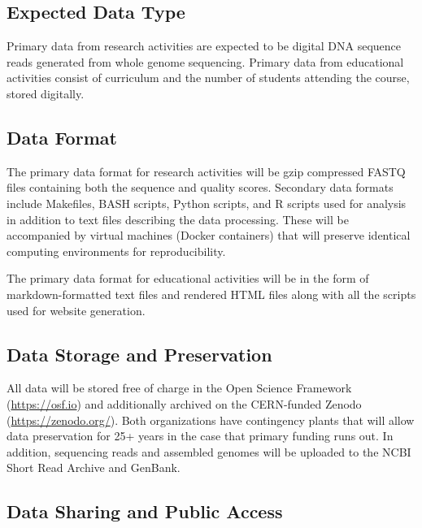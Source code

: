 \documentclass[12pt,letterpaper]{article}
\title{\ruleline{Data Management Plan}}
\begin{document}
\maketitle

\subsection{Expected Data Type}

Primary data from research activities are expected to be digital DNA sequence reads generated from whole genome sequencing. Primary data from educational activities consist of curriculum and the number of students attending the course, stored digitally. 

\subsection{Data Format}

The primary data format for research activities will be gzip compressed FASTQ files containing both the sequence and quality scores. Secondary data formats include Makefiles, BASH scripts, Python scripts, and R scripts used for analysis in addition to text files describing the data processing.
These will be accompanied by virtual machines (Docker containers) that will preserve identical computing environments for reproducibility. 

The primary data format for educational activities will be in the form of markdown-formatted text files and rendered HTML files along with all the scripts used for website generation. 

\subsection{Data Storage and Preservation}

All data will be stored free of charge in the Open Science Framework (\url{https://osf.io}) and additionally archived on the CERN-funded Zenodo (\url{https://zenodo.org/}). Both organizations have contingency plants that will allow data preservation for 25+ years in the case that primary funding runs out. In addition, sequencing reads and assembled genomes will be uploaded to the NCBI Short Read Archive and GenBank. 

\subsection{Data Sharing and Public Access}
\end{document}
